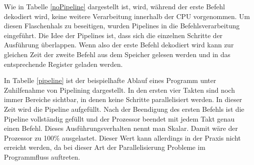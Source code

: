 \documentclass[a4paper,12pt]{article}
\begin{document}
\par\bigskip\noindent Wie in Tabelle \ref{noPipeline} dargestellt ist, wird, während der erste Befehl dekodiert wird, keine weitere Verarbeitung innerhalb der CPU vorgenommen. Um diesen Flaschenhals zu beseitigen, wurden Pipelines in die Befehlsverarbeitung eingeführt. Die Idee der Pipelines ist, dass sich die einzelnen Schritte der Ausführung überlappen. Wenn also der erste Befehl dekodiert wird kann zur gleichen Zeit der zweite Befehl aus dem Speicher gelesen werden und in das entsprechende Register geladen werden.


\noindent In Tabelle \ref{pipeline} ist der beispielhafte Ablauf eines Programm unter Zuhilfenahme von Pipelining dargestellt. In den ersten vier Takten sind noch immer Bereiche sichtbar, in denen keine Schritte parallelisiert werden. In dieser Zeit wird die Pipeline aufgefüllt. Nach der Beendigung des ersten Befehls ist die Pipeline vollständig gefüllt und der Prozessor beendet mit jedem Takt genau einen Befehl. Dieses Ausführungsverhalten nennt man Skalar. Damit wäre der Prozessor zu 100\% ausgelastet. Dieser Wert kann allerdings in der Praxis nicht erreicht werden, da bei dieser Art der Parallelisierung Probleme im Programmfluss auftreten.
\end{document}
